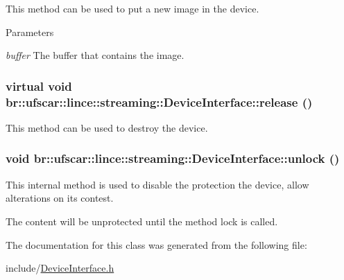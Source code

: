 This method can be used to put a new image in the device. 


\begin{DoxyParams}{Parameters}
\item[{\em buffer}]The buffer that contains the image. \end{DoxyParams}
\hypertarget{classbr_1_1ufscar_1_1lince_1_1streaming_1_1DeviceInterface_a6c7a433458ca2b3cf93b2bc118fec114}{
\subsubsection[{release}]{\setlength{\rightskip}{0pt plus 5cm}virtual void br::ufscar::lince::streaming::DeviceInterface::release ()}}
\label{classbr_1_1ufscar_1_1lince_1_1streaming_1_1DeviceInterface_a6c7a433458ca2b3cf93b2bc118fec114}


This method can be used to destroy the device. 

\hypertarget{classbr_1_1ufscar_1_1lince_1_1streaming_1_1DeviceInterface_aab816345220d1eed3838635dfebb40d6}{
\subsubsection[{unlock}]{\setlength{\rightskip}{0pt plus 5cm}void br::ufscar::lince::streaming::DeviceInterface::unlock ()}}
\label{classbr_1_1ufscar_1_1lince_1_1streaming_1_1DeviceInterface_aab816345220d1eed3838635dfebb40d6}


This internal method is used to disable the protection the device, allow alterations on its contest. 

The content will be unprotected until the method lock is called. 

The documentation for this class was generated from the following file:\begin{DoxyCompactItemize}
\item 
include/\hyperlink{DeviceInterface_8h}{DeviceInterface.h}\end{DoxyCompactItemize}
